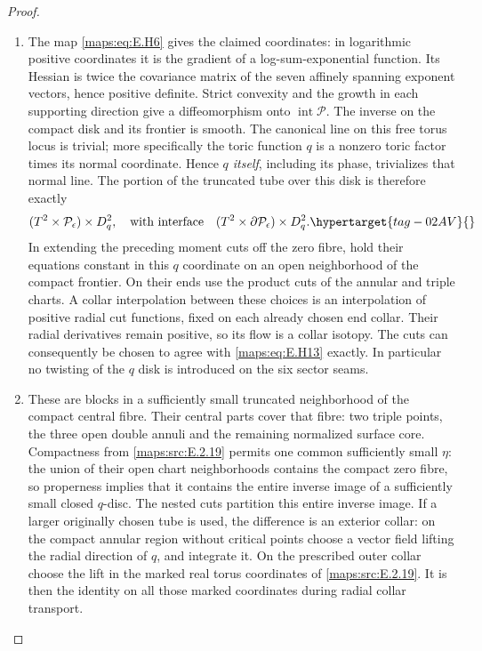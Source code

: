 \begin{proof}
\begin{enumerate}[label=\arabic*.,leftmargin=*]
\item The map \eqref{maps:eq:E.H6} gives the claimed coordinates: in logarithmic
positive coordinates it is the gradient of a log-sum-exponential
function.  Its Hessian is twice the covariance matrix of the
seven affinely spanning exponent vectors, hence positive
definite.  Strict convexity and the growth in each supporting
direction give a diffeomorphism onto
$\operatorname{int}\mathcal P$.  The inverse on the compact
disk and its frontier is smooth.  The canonical line on this
free torus locus is trivial; more specifically the toric
function $q$ is a nonzero toric factor times its normal
coordinate.  Hence \emph{$q$ itself}, including its phase,
trivializes that normal line.  The portion of the truncated
tube over this disk is therefore exactly
\begin{equation}
 (T^2\times\mathcal P_\epsilon)\times D^2_q,
 \quad\hbox{with interface}\quad
 (T^2\times\partial\mathcal P_\epsilon)\times D^2_q.
 \hypertarget{tag-02AV}{}\label{maps:eq:E.H13}
\end{equation}
In extending the preceding moment cuts off the zero fibre,
hold their equations constant in this $q$ coordinate on an
open neighborhood of the compact frontier.  On their ends
use the product cuts of the annular and triple charts.  A
collar interpolation between these choices is an interpolation
of positive radial cut functions, fixed on each already chosen
end collar.  Their radial derivatives remain positive, so its
flow is a collar isotopy.  The cuts can consequently be chosen
to agree with \eqref{maps:eq:E.H13} exactly.  In particular no twisting of
the $q$ disk is introduced on the six sector seams.

\item These are blocks in a sufficiently small truncated
neighborhood of the compact central fibre.  Their central
parts cover that fibre: two triple points, the three open
double annuli and the remaining normalized surface core.
Compactness from \ref{maps:src:E.2.19} permits one common sufficiently small
$\eta$: the union of their open chart neighborhoods contains
the compact zero fibre, so properness implies that it contains
the entire inverse image of a sufficiently small closed
$q$-disc.  The nested cuts partition this entire inverse image.
If a larger originally chosen tube is used, the
difference is an exterior collar: on the compact annular
region without critical points choose a vector field lifting
the radial direction of $q$, and integrate it.  On the
prescribed outer collar choose the lift in the marked real
torus coordinates of \ref{maps:src:E.2.19}.  It is then the identity on all
those marked coordinates during radial collar transport.



\end{enumerate}
\end{proof}
